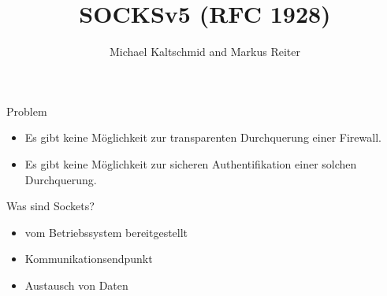 \documentclass[t]{beamer}
\title{SOCKSv5 (RFC 1928)}
\author{Michael Kaltschmid and Markus Reiter}
\date{\printdate{2017-06-13}}
\begin{document}
  \RaggedRight

  \maketitle

  \begin{frame}{Problem}
    \begin{itemize}
      \item Es gibt keine Möglichkeit zur transparenten Durchquerung einer Firewall.
      \item Es gibt keine Möglichkeit zur sicheren Authentifikation einer solchen Durchquerung.
    \end{itemize}
  \end{frame}

  \begin{frame}{Was sind Sockets?}
    \begin{itemize}
      \item vom Betriebssystem bereitgestellt
      \item Kommunikationsendpunkt
      \item Austausch von Daten
    \end{itemize}
  \end{frame}
	
\end{document}
